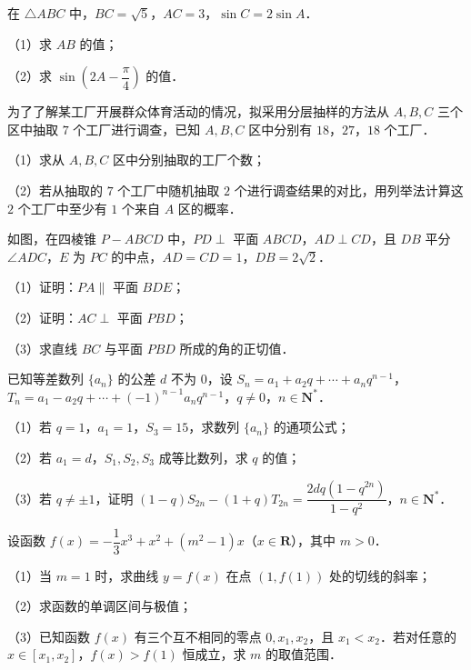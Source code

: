 \begin{question}
在 $\triangle ABC$ 中，$BC=\sqrt5$，$AC=3$，$\sin C=2\sin A$．

（1）求 $AB$ 的值；

（2）求 $\sin\left(2A-\dfrac{\pi}{4}\right)$ 的值．

\end{question}
\begin{question}
为了了解某工厂开展群众体育活动的情况，拟采用分层抽样的方法从 $A,B,C$ 三个区中抽取 $7$ 个工厂进行调查，已知 $A,B,C$ 区中分别有 $18$，$27$，$18$ 个工厂．

（1）求从 $A,B,C$ 区中分别抽取的工厂个数；

（2）若从抽取的 $7$ 个工厂中随机抽取 $2$ 个进行调查结果的对比，用列举法计算这 $2$ 个工厂中至少有 $1$ 个来自 $A$ 区的概率．

\Needspace{0.4\textheight}
\end{question}
\begin{question}
如图，在四棱锥 $P-ABCD$ 中，$PD\perp$ 平面 $ABCD$，$AD\perp CD$，且 $DB$ 平分 $\angle ADC$，$E$ 为 $PC$ 的中点，$AD=CD=1$，$DB=2\sqrt2$．
\nopagebreak[4]
\begin{center}\end{center}
\nopagebreak[4]
（1）证明：$PA\parallel$ 平面 $BDE$；

（2）证明：$AC\perp$ 平面 $PBD$；

（3）求直线 $BC$ 与平面 $PBD$ 所成的角的正切值．

\end{question}
\begin{question}
已知等差数列 $\{a_n\}$ 的公差 $d$ 不为 $0$，设 $S_n=a_1+a_2q+\cdots+a_nq^{n-1}$，$T_n=a_1-a_2q+\cdots+(-1)^{n-1}a_nq^{n-1}$，$q\neq0$，$n\in\mathbf N^*$．

（1）若 $q=1$，$a_1=1$，$S_3=15$，求数列 $\{a_n\}$ 的通项公式；

（2）若 $a_1=d$，$S_1,S_2,S_3$ 成等比数列，求 $q$ 的值；

（3）若 $q\neq\pm1$，证明 $(1-q)S_{2n}-(1+q)T_{2n}=\dfrac{2dq(1-q^{2n})}{1-q^2}$，$n\in\mathbf N^*$．

\end{question}
\begin{question}
设函数 $f(x)=-\dfrac13x^3+x^2+(m^2-1)x$（$x\in\mathbf R$），其中 $m>0$．

（1）当 $m=1$ 时，求曲线 $y=f(x)$ 在点 $(1,f(1))$ 处的切线的斜率；

（2）求函数的单调区间与极值；

（3）已知函数 $f(x)$ 有三个互不相同的零点 $0,x_1,x_2$，且 $x_1<x_2$．若对任意的 $x\in[x_1,x_2]$，$f(x)>f(1)$ 恒成立，求 $m$ 的取值范围．

\end{question}
